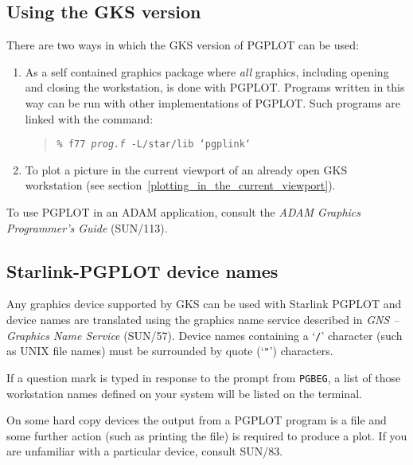 \documentclass[twoside,11pt]{article}
\newcommand{\htmlref}[2]{#1}
\newcommand{\latexhtml}[2]{#1}
\newcommand{\xref}[3]{#1}
\newcommand{\xlabel}[1]{}
\renewcommand{\_}{\texttt{\symbol{95}}}
\begin{document}
\subsection{\xlabel{using_the_gks_version}Using the GKS version}
\label{using_the_gks_version}

There are two ways in which the GKS version of PGPLOT can be used:
     
\begin{enumerate}

\item As a self contained graphics package where \emph{all} graphics, including
opening and closing the workstation, is done with PGPLOT. Programs written in
this way can be run with other implementations of PGPLOT. Such programs
are linked with the command:

\begin{quote}
\texttt{\% f77 \emph{prog.f} -L/star/lib `pgp\_link`}
\end{quote}

\item To plot a picture in the current viewport of an already open GKS
workstation (see \latexhtml{section~\ref{plotting_in_the_current_viewport}} %
{\htmlref{Plotting in the current viewport}{plotting_in_the_current_viewport}}). 
\end{enumerate}

To use PGPLOT in an ADAM application, consult the 
\xref{\emph{ADAM Graphics Programmer's Guide}}{sun113}{} (SUN/113).

\subsection{\xlabel{starlink-pgplot_device_names}Starlink-PGPLOT device names}
\label{starlink-pgplot_device_names}

Any graphics device supported by GKS can be used with Starlink PGPLOT
and device names are translated using the graphics name service
described in \xref{\emph{GNS -- Graphics Name
Service}}{sun57}{GKSWorkstationNames} (SUN/57).  Device names
containing a `\texttt{/}' character (such as UNIX file names) must be
surrounded by quote (`\texttt{"}') characters.

If a question mark is typed in response to the prompt from
\xref{\texttt{PGBEG}}{sun15}{PGBEG}, a list of those workstation names
defined on your system will be listed on the terminal.

On some hard copy devices the output from a PGPLOT program is a file
and some further action (such as printing the file) is required to
produce a plot.  If you are unfamiliar with a particular device,
consult \xref{SUN/83}{sun83}{}.
\end{document}

